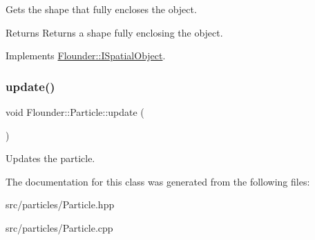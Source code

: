 Gets the shape that fully encloses the object. 

\begin{DoxyReturn}{Returns}
Returns a shape fully enclosing the object. 
\end{DoxyReturn}


Implements \hyperlink{class_flounder_1_1_i_spatial_object_ae1e28211dc94c4229baf284ea10ff556}{Flounder\+::\+I\+Spatial\+Object}.

\mbox{\label{class_flounder_1_1_particle_a79c8b467791029cda2158655403741f0}} 
\subsubsection{\texorpdfstring{update()}{update()}}
{\footnotesize\ttfamily void Flounder\+::\+Particle\+::update (\begin{DoxyParamCaption}{ }\end{DoxyParamCaption})}



Updates the particle. 



The documentation for this class was generated from the following files\+:\begin{DoxyCompactItemize}
\item 
src/particles/Particle.\+hpp\item 
src/particles/Particle.\+cpp\end{DoxyCompactItemize}
